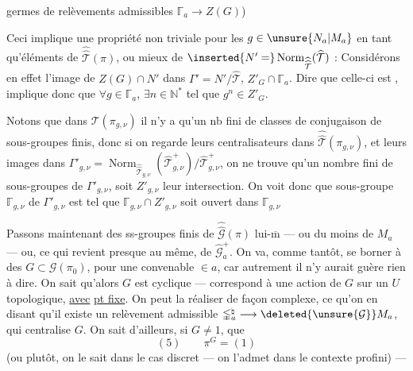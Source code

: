 
germes de relèvements admissibles $\mathbb{\Gamma}_a\to Z(G)$)

Ceci implique une propriété non triviale pour
les $g\in\unsure{N_a|M_a}$  en tant qu'éléments de $\widehat{\widehat{\mathcal T}}(\pi)$,
ou mieux de $\inserted{N'=}\operatorname{Norm}_{\widehat{\widehat{\mathcal T}}}(\widehat{\mathcal T})$ :
Considérons en effet l'image  de
$Z(G)\cap N'$ dans $\Gamma'=N'/\widehat{\mathcal T}$, 
$Z'_G\cap\mathbb{\Gamma}_a$. Dire que celle-ci est  ,
implique donc que $\forall g\in\mathbb{\Gamma}_a$,  $\exists n\in\mathbb N^{*}$
tel que $g^n\in Z'_G$. 

Notons que dans $\mathcal T(\pi_{g,\nu})$ il n'y a
qu'un nb fini de classes de conjugaison
de sous-groupes finis, donc si on
regarde leurs centralisateurs  dans
$\widehat{\widehat{\mathcal T}}(\pi_{g,\nu})$, et leurs images dans
$\Gamma'_{g,\nu}=\operatorname{Norm}_{\widehat{\widehat{\mathcal T}}_{g,\nu}}(\widehat{\mathcal T}^{+}_{g,\nu})/\widehat{\mathcal T}^{+}_{g,\nu}$, on ne
trouve qu'un nombre fini de sous-groupes
de $\Gamma'_{g,\nu}$, soit $Z'_{g,\nu}$ leur intersection.
On voit donc que  sous-groupe $\mathbb{\Gamma}_{g,\nu}$
de $\Gamma'_{g,\nu}$ est tel que $\mathbb{\Gamma}_{g,\nu}\cap Z'_{g,\nu}$ soit
ouvert dans $\mathbb{\Gamma}_{g,\nu}$


Passons maintenant  des ss-groupes
finis de $\widehat{\widehat{\mathcal G}}(\pi)$ lui-$\overline{\mathrm m}$ --- ou du moins
de $M_a$ --- ou, ce qui revient presque au
même, de $\widehat{\mathcal G}^{+}_a$. On va, comme
tantôt, se borner à des $G\subset\mathcal G(\pi_0)$,
pour une  convenable $\in a$,
car autrement il n'y aurait guère rien à
dire. On sait qu'alors $G$ est
cyclique ---  correspond à une action
de $G$ sur un $U$ topologique, \uline{avec}
\uline{pt fixe}. On peut la réaliser de
façon complexe, ce qu'on  en
disant qu'il existe un relèvement
admissible $\mathbb{\Gamma}_a^{\natural}\longrightarrow\deleted{\unsure{\mathcal G}} M_a$, qui
centralise $G$. On sait d'ailleurs, si
$G\ne1$, que \deleted{$\unsure{\pi}$}
\[
(5)\qquad \pi^G=(1)
\]
(ou plutôt, on le sait dans le cas discret ---
on l'admet dans le contexte profini) ---

